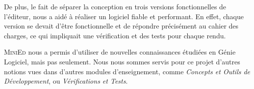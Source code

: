 \documentclass[a4paper]{article}
\begin{document}
	\vspace{0.5cm}

	De plus, le fait de séparer la conception en trois versions fonctionnelles de l'éditeur, nous a aidé à réaliser un logiciel fiable et performant. En effet, chaque version se devait d'être fonctionnelle et de répondre précisément au cahier des charges, ce qui impliquait une vérification et des tests pour chaque rendu. 

	\vspace{0.5cm}

	\textsc{MiniEd} nous a permis d’utiliser de nouvelles connaissances étudiées en Génie Logiciel, mais pas seulement. Nous nous sommes servis pour ce projet d'autres notions vues dans d’autres modules d'enseignement, comme \textit{Concepts et Outils de Développement}, ou \textit{Vérifications et Tests}.
\end{document}
